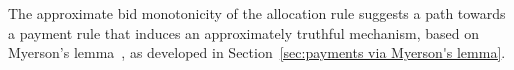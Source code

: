 \documentclass[format=acmsmall, review=false]{acmart}
\begin{document}
The approximate bid monotonicity of the allocation rule suggests a path towards a payment rule that induces an approximately truthful mechanism, based on Myerson's lemma~\cite{myerson1981optimal}, as developed in Section~\ref{sec:payments via Myerson's lemma}. 



\end{document}

